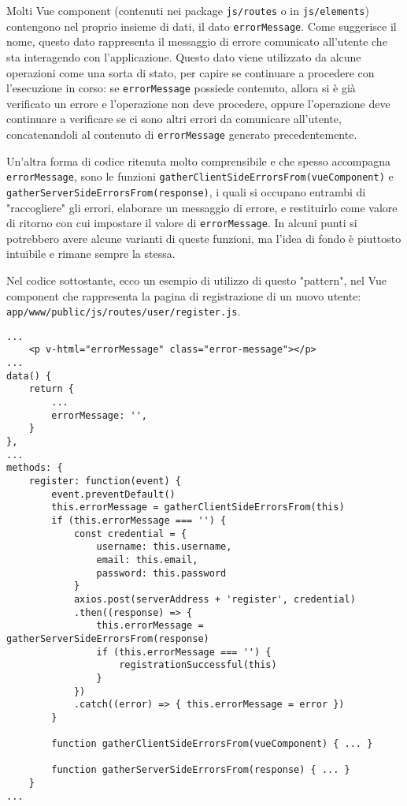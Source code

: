 Molti Vue component (contenuti nei package \texttt{js/routes} o in \texttt{js/elements}) contengono nel proprio insieme di dati, il dato \texttt{errorMessage}. Come suggerisce il nome, questo dato rappresenta il messaggio di errore comunicato all'utente che sta interagendo con l'applicazione. Questo dato viene utilizzato da alcune operazioni come una sorta di stato, per capire se continuare a procedere con l'esecuzione in corso: se \texttt{errorMessage} possiede contenuto, allora si è già verificato un errore e l'operazione non deve procedere, oppure l'operazione deve continuare a verificare se ci sono altri errori da comunicare all'utente, concatenandoli al contenuto di \texttt{errorMessage} generato precedentemente.

Un'altra forma di codice ritenuta molto comprensibile e che spesso accompagna \texttt{errorMessage}, sono le funzioni \texttt{gatherClientSideErrorsFrom(vueComponent)} e \texttt{gatherServerSideErrorsFrom(response)}, i quali si occupano entrambi di "raccogliere" gli errori, elaborare un messaggio di errore, e restituirlo come valore di ritorno con cui impostare il valore di \texttt{errorMessage}.
\newline
In alcuni punti si potrebbero avere alcune varianti di queste funzioni, ma l'idea di fondo è piuttosto intuibile e rimane sempre la stessa.

Nel codice sottostante, ecco un esempio di utilizzo di questo "pattern", nel Vue component che rappresenta la pagina di registrazione di un nuovo utente: \texttt{app/www/public/js/routes/user/register.js}.
\begin{lstlisting}
...
	<p v-html="errorMessage" class="error-message"></p>
...
data() {
	return {
		...
		errorMessage: '',
	}
},
...
methods: {
	register: function(event) {
		event.preventDefault()
		this.errorMessage = gatherClientSideErrorsFrom(this)
		if (this.errorMessage === '') {
			const credential = {
				username: this.username,
				email: this.email,
				password: this.password
			}
			axios.post(serverAddress + 'register', credential)
			.then((response) => {
				this.errorMessage = gatherServerSideErrorsFrom(response)
				if (this.errorMessage === '') {
					registrationSuccessful(this)
				}
			})
			.catch((error) => { this.errorMessage = error })
		}
		
		function gatherClientSideErrorsFrom(vueComponent) { ... }
		
		function gatherServerSideErrorsFrom(response) { ... }
	}
...
\end{lstlisting}

